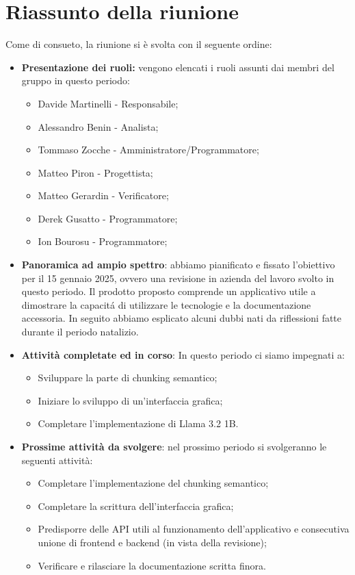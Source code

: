 \section{Riassunto della riunione}
Come di consueto, la riunione si  è svolta con il seguente ordine:
\begin{itemize}
    \item \textbf{Presentazione dei ruoli:} vengono elencati i ruoli assunti dai membri del gruppo
in questo periodo:
    \begin{itemize}
        \item Davide Martinelli - Responsabile;
        \item Alessandro Benin - Analista;
        \item Tommaso Zocche - Amministratore/Programmatore;
        \item Matteo Piron - Progettista;
        \item Matteo Gerardin - Verificatore;
        \item Derek Gusatto - Programmatore;
        \item Ion Bourosu - Programmatore;
    \end{itemize}

    \item \textbf{Panoramica ad ampio spettro}: abbiamo pianificato e fissato l'obiettivo per il 15 gennaio 2025, ovvero una revisione in azienda del lavoro svolto in questo periodo. Il prodotto proposto comprende un applicativo utile a dimostrare la capacitá di utilizzare le tecnologie e la documentazione accessoria. In seguito abbiamo esplicato alcuni dubbi nati da riflessioni fatte durante il periodo natalizio.

     \item \textbf{Attività completate ed in corso}: In questo periodo ci siamo impegnati a:
     \begin{itemize}
         \item Sviluppare la parte di chunking semantico;
         \item Iniziare lo sviluppo di un'interfaccia grafica;
         \item Completare l'implementazione di Llama 3.2 1B.
     \end{itemize}

     \item \textbf{Prossime attività da svolgere}: nel prossimo periodo si svolgeranno le seguenti attività:
     \begin{itemize}
         \item Completare l'implementazione del chunking semantico;
         \item Completare la scrittura dell'interfaccia grafica;
         \item Predisporre delle API utili al funzionamento dell'applicativo e consecutiva unione di frontend e backend (in vista della revisione);
         \item Verificare e rilasciare la documentazione scritta finora.
     \end{itemize}


\end{itemize}

